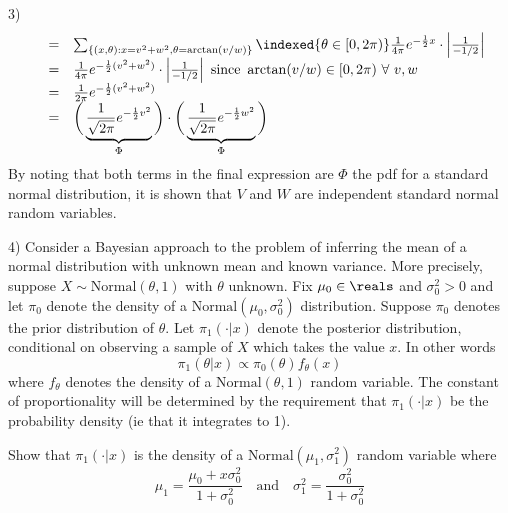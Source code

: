 \documentclass[11pt,a4paper]{article}
\begin{document}
\begin{answer}{3)}
\[\begin{array}{rcl}
      &=&\sum_{\{(x,\theta):x=v^2+w^2,\theta=\arctan(v/w)\}}\indexed\{\theta\in[0,2\pi)\}\frac1{4\pi}e^{-\frac12x}\cdot\left|\frac1{-1/2}\right|\\
      &=&\frac1{4\pi}e^{-\frac12(v^2+w^2)}\cdot\left|\frac1{-1/2}\right|\text{ since }\arctan(v/w)\in[0,2\pi)\ \forall\ v,w\\
      &=&\frac1{2\pi}e^{-\frac12(v^2+w^2)}\\
      &=&\bigg(\underbrace{\frac1{\sqrt{2\pi}}e^{-\frac12v^2}}_\Phi\bigg)\cdot\bigg(\underbrace{\frac1{\sqrt{2\pi}}e^{-\frac12w^2}}_\Phi\bigg)
  \end{array}\]
  By noting that both terms in the final expression are $\Phi$ the pdf for a standard normal distribution, it is shown that $V$ and $W$ are independent standard normal random variables.
\end{answer}

\begin{question}{4)}
  Consider a Bayesian approach to the problem of inferring the mean of a normal distribution with unknown mean and known variance. More precisely, suppose $X\sim\text{Normal}(\theta,1)$ with $\theta$ unknown. Fix $\mu_0\in\reals$ and $\sigma^2_0>0$ and let $\pi_0$ denote the density of a $\text{Normal}(\mu_0,\sigma^2_0)$ distribution. Suppose $\pi_0$ denotes the prior distribution of $\theta$. Let $\pi_1(\cdot|x)$ denote the posterior distribution, conditional on observing a sample of $X$ which takes the value $x$. In other words
  \[ \pi_1(\theta|x)\propto\pi_0(\theta)f_\theta(x) \]
  where $f_\theta$ denotes the density of a $\text{Normal}(\theta,1)$ random variable. The constant of proportionality will be determined by the requirement that $\pi_1(\cdot|x)$ be the probability density (ie that it integrates to 1).
  \par Show that $\pi_1(\cdot|x)$ is the density of a $\text{Normal}(\mu_1,\sigma^2_1)$ random variable where
  \[ \mu_1=\frac{\mu_0+x\sigma^2_0}{1+\sigma^2_0}\quad\text{and}\quad\sigma^2_1=\frac{\sigma^2_0}{1+\sigma^2_0} \]
\end{question}
\end{document}

